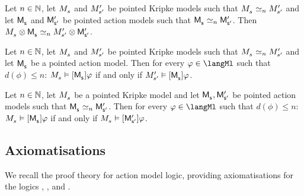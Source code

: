 \begin{proposition}
Let $n \in \mathbb{N}$,
let $\kPModel{\kStateS}$ and ${M^{\prime}_{{s}^{\prime}}}$ be pointed Kripke models such that $\kPModel{\kStateS} \bisimilar[n] \kPModelP{\kStateSP}$ and
let $\aPModel{\aStateS}$ and ${\mathsf{M}^{\prime}_{{\mathsf{{s}}^{\prime}}}}$ be pointed action models such that $\aPModel{\aStateS} \bisimilar[n] \aPModelP{\aStateSP}$.
Then $\kPModel{\kStateS} \exec \aPModel{\aStateS} \bisimilar[n] \kPModelP{\kStateSP} \exec \aPModelP{\aStateSP}$.
\end{proposition}

\begin{proposition}
Let $n \in \mathbb{N}$,
let $\kPModel{\kStateS}$ and ${M^{\prime}_{{s}^{\prime}}}$ be pointed Kripke models such that $\kPModel{\kStateS} \bisimilar[n] \kPModelP{\kStateSP}$ and
let $\aPModel{\aStateS}$ be a pointed action model.
Then for every $\phi \in \langMl$ such that $d(\phi) \leq n$: $\kPModel{\kStateS} \entails \actionA{\aPModel{\aStateS}} \phi$ if and only if $\kPModelP{\kStateSP} \entails \actionA{\aPModel{\aStateS}} \phi$.
\end{proposition}

\begin{proposition}
Let $n \in \mathbb{N}$,
let $\kPModel{\kStateS}$ be a pointed Kripke model and
let $\aPModel{\aStateS}, \aPModelP{\aStateSP}$ be pointed action models such that $\aPModel{\aStateS} \bisimilar[n] \aPModelP{\aStateSP}$.
Then for every $\phi \in \langMl$ such that $d(\phi) \leq n$: $\kPModel{\kStateS} \entails \actionA{\aPModel{\aStateS}} \phi$ if and only if $\kPModel{\kStateS} \entails \actionA{\aPModelP{\aStateSP}} \phi$.
\end{proposition}

\subsection{Axiomatisations}

We recall the proof theory for action model logic, providing axiomatisations for the logics \logicAmlK{}, \logicAmlKFF{}, and \logicAmlS{}.

